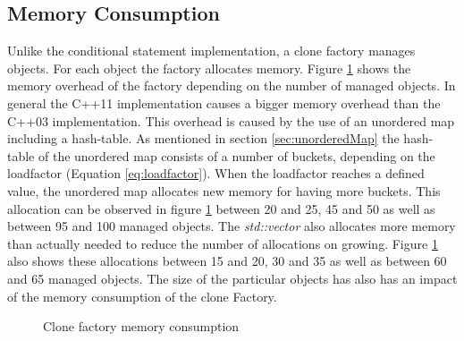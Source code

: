 {\subsection{Memory Consumption}\label{sec:memoryConsumptionCloneFactory}
\noindent Unlike the conditional statement implementation, a clone factory manages objects. For each object the factory allocates memory. Figure \ref{fig:cloneFactoryMemoryConsumption} shows the memory overhead of the factory depending on the number of managed objects. In general the C++11 implementation causes a bigger memory overhead than the C++03 implementation. This overhead is caused by the use of an unordered map including a hash-table. As mentioned in section \ref{sec:unorderedMap} the hash-table of the unordered map consists of a number of buckets, depending on the loadfactor (Equation \ref{eq:loadfactor}). When the loadfactor reaches a defined value, the unordered map allocates new memory for having more buckets. This allocation can be observed in figure \ref{fig:cloneFactoryMemoryConsumption} between 20 and 25, 45 and 50 as well as between 95 and 100 managed objects. The \emph{std::vector} also allocates more memory than actually needed to reduce the number of allocations on growing. \cite[cf.][]{CppReference2014_vector}  Figure \ref{fig:cloneFactoryMemoryConsumption} also shows these allocations between 15 and 20, 30 and 35 as well as between 60 and 65 managed objects. The size of the particular objects has also has an impact of the memory consumption of the clone Factory. 

\begin{figure}[h]{}
\centering
\mbox{}
\caption{Clone factory memory consumption}
\label{fig:cloneFactoryMemoryConsumption}
\end{figure}
 
}

